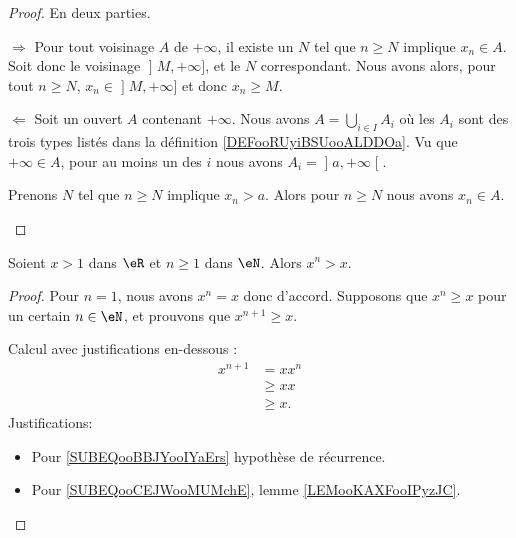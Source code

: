 \begin{proof}
	En deux parties.
	\begin{subproof}
		\item[\( \Rightarrow\)]
		Pour tout voisinage \( A\) de \( +\infty\), il existe un \( N\) tel que \( n\geq N\) implique \( x_n\in A\). Soit donc le voisinage \( \mathopen] M , +\infty \mathclose]\), et le \( N\) correspondant. Nous avons alors, pour tout \( n\geq N\), \( x_n\in \mathopen] M , +\infty \mathclose]\) et donc \( x_n\geq M\).
		\item[\( \Leftarrow\)]
		Soit un ouvert \( A\) contenant \( +\infty\). Nous avons \( A=\bigcup_{i\in I} A_i\) où les \( A_i\) sont des trois types listés dans la définition \ref{DEFooRUyiBSUooALDDOa}. Vu que \( +\infty\in A\), pour au moins un des \( i\) nous avons \( A_i=\mathopen] a , +\infty \mathclose[\).

		Prenons \( N\) tel que \( n\geq N\) implique \( x_n>a\). Alors pour \( n\geq N\) nous avons \( x_n\in A\).
	\end{subproof}
\end{proof}


\begin{lemma}        \label{LEMooUBFAooEmquQQ}
	Soient \( x>1\) dans \( \eR\) et \( n\geq 1\) dans \( \eN\). Alors \( x^n> x\).
\end{lemma}

\begin{proof}
	Pour \( n=1\), nous avons \( x^n=x\) donc d'accord. Supposons que \( x^n\geq x\) pour un certain \( n\in \eN\), et prouvons que \( x^{n+1}\geq x\).

	Calcul avec justifications en-dessous :
	\begin{subequations}
		\begin{align}
			x^{n+1} & =xx^n                                      \\
			        & \geq xx        \label{SUBEQooBBJYooIYaErs} \\
			        & \geq x.        \label{SUBEQooCEJWooMUMchE}
		\end{align}
	\end{subequations}
	Justifications:
	\begin{itemize}
		\item Pour \eqref{SUBEQooBBJYooIYaErs} hypothèse de récurrence.
		\item Pour \eqref{SUBEQooCEJWooMUMchE}, lemme \ref{LEMooKAXFooIPyzJC}.
	\end{itemize}
\end{proof}

